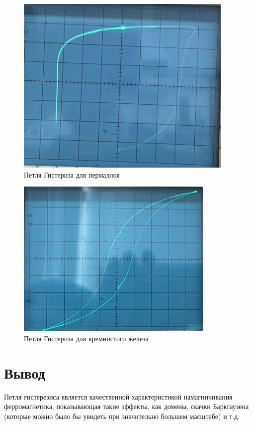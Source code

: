 \documentclass[a4paper]{article}
\theoremstyle{definition}
\theoremstyle{remark}
\begin{document}
    \begin{figure}[h!]
        \centering
        \includegraphics[width=0.5\linewidth]{image/perm.png}
        \caption{Петля Гистериза для пермаллоя}
    \end{figure}

    \begin{figure}[h!]
        \centering
        \includegraphics[width=0.5\linewidth]{image/krfer.png}
        \caption{Петля Гистериза для кремнистого железа}
    \end{figure}

    \section{Вывод}

    Петля гистерезиса является качественной характеристикой намагничивания ферромагнетика, показывающая такие эффекты, как домены, скачки Баркгаузена (которые можно было бы увидеть при значительно большем масштабе) и т.д.
    
\end{document}
